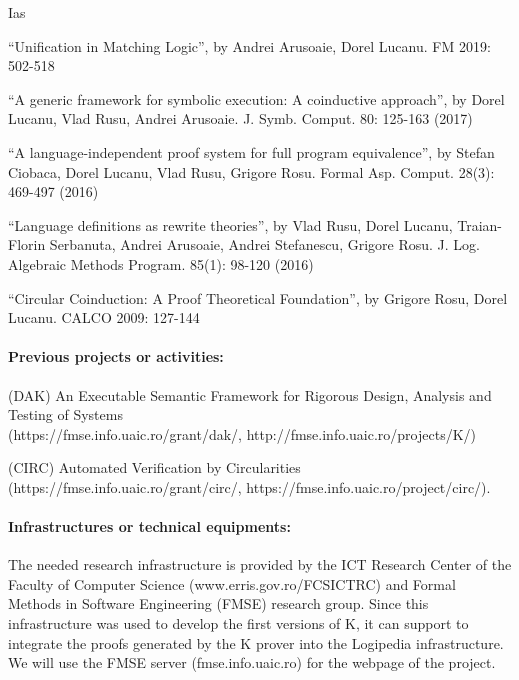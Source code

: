 \begin{sitedescription}{Ias}
\begin{compactitem}
\item ``Unification in Matching Logic'', by Andrei Arusoaie, Dorel Lucanu. FM 2019: 502-518
\item ``A generic framework for symbolic execution: A coinductive approach'', by Dorel Lucanu, Vlad Rusu, Andrei Arusoaie. J. Symb. Comput. 80: 125-163 (2017)
\item ``A language-independent proof system for full program equivalence'', by Stefan Ciobaca, Dorel Lucanu, Vlad Rusu, Grigore Rosu. Formal Asp. Comput. 28(3): 469-497 (2016)
\item ``Language definitions as rewrite theories'', by Vlad Rusu, Dorel Lucanu, Traian-Florin Serbanuta, Andrei Arusoaie, Andrei Stefanescu, Grigore Rosu. J. Log. Algebraic Methods Program. 85(1): 98-120 (2016)
\item ``Circular Coinduction: A Proof Theoretical Foundation'', by Grigore Rosu, Dorel Lucanu. CALCO 2009: 127-144
\end{compactitem}

\paragraph*{Previous projects or activities:}


\begin{compactitem}
\item  (DAK) An Executable Semantic Framework for Rigorous Design, Analysis and Testing of Systems\\
 (https://fmse.info.uaic.ro/grant/dak/, http://fmse.info.uaic.ro/projects/K/) 
\item (CIRC) Automated Verification by Circularities\\  (https://fmse.info.uaic.ro/grant/circ/, https://fmse.info.uaic.ro/project/circ/).
\end{compactitem}

\paragraph*{Infrastructures or technical equipments:}

The needed research infrastructure is provided by the ICT Research Center of the Faculty of Computer Science (www.erris.gov.ro/FCSICTRC) and Formal Methods in Software Engineering (FMSE) research group. Since this infrastructure was used to develop the first versions of K, it can support to integrate the proofs generated by the K prover into the Logipedia infrastructure. We will use the FMSE server (fmse.info.uaic.ro) for the webpage of the project. 


\end{sitedescription}
